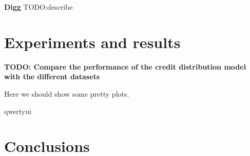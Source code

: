 \documentclass{acm_proc_article-sp}
\begin{document}
\textbf{Digg} \cite{data:digg-friends,data:digg-votes,data:digg} TODO:describe \cite{DBLP:journals/corr/abs-1202-3162}


 \cite{DBLP:journals/corr/abs-1202-3162}


\section{Experiments and results}
\textbf{TODO: Compare the performance of the credit distribution model with the different datasets}

Here we should show some pretty plots.


qwertyui

\section{Conclusions}


%

%

\balancecolumns
\end{document}
